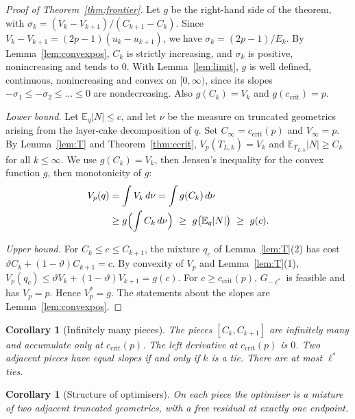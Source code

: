 \documentclass[conference]{IEEEtran}
\newtheorem{corollary}[theorem]{Corollary}
\newcommand{\E}{\mathbb{E}}
\newcommand{\ccrit}{c_{\mathrm{crit}}}
\begin{document}
\begin{proof}[Proof of Theorem~\ref{thm:frontier}]
Let \(g\) be the right-hand side of the theorem, with \(\sigma_k=(V_k-V_{k+1})/(C_{k+1}-C_k)\). Since \(V_k-V_{k+1}=(2p-1)(u_k-u_{k+1})\), we have \(\sigma_k=(2p-1)/E_k\). By Lemma~\ref{lem:convexpos}, \(C_k\) is strictly increasing, and \(\sigma_k\) is positive, nonincreasing and tends to \(0\). With Lemma~\ref{lem:limit}, \(g\) is well defined, continuous, nonincreasing and convex on \([0,\infty)\), since its slopes \(-\sigma_1\le-\sigma_2\le\dots\le0\) are nondecreasing. Also \(g(C_k)=V_k\) and \(g(\ccrit)=p\).

\emph{Lower bound.} Let \(\E_q|N|\le c\), and let \(\nu\) be the measure on truncated geometrics arising from the layer-cake decomposition of \(q\). Set \(C_\infty=\ccrit(p)\) and \(V_\infty=p\). By Lemma~\ref{lem:T} and Theorem~\ref{thm:ccrit}, \(V_p(T_{L,k})=V_k\) and \(\E_{T_{L,k}}|N|\ge C_k\) for all \(k\le\infty\). We use \(g(C_k)=V_k\), then Jensen's inequality for the convex function \(g\), then monotonicity of \(g\):
\begin{align*}
V_p(q)&=\int V_k\,d\nu=\int g(C_k)\,d\nu\\
&\ge g\Bigl(\int C_k\,d\nu\Bigr)\ \ge\ g\bigl(\E_q|N|\bigr)\ \ge\ g(c).
\end{align*}

\emph{Upper bound.} For \(C_k\le c\le C_{k+1}\), the mixture \(q_c\) of Lemma~\ref{lem:T}(2) has cost \(\vartheta C_k+(1-\vartheta)C_{k+1}=c\). By convexity of \(V_p\) and Lemma~\ref{lem:T}(1), \(V_p(q_c)\le\vartheta V_k+(1-\vartheta)V_{k+1}=g(c)\). For \(c\ge\ccrit(p)\), \(G_{-\ell^*}\) is feasible and has \(V_p=p\). Hence \(V_p^*=g\). The statements about the slopes are Lemma~\ref{lem:convexpos}.
\end{proof}

\begin{corollary}[Infinitely many pieces]\label{cor:pieces}
The pieces \([C_k,C_{k+1}]\) are infinitely many and accumulate only at \(\ccrit(p)\). The left derivative at \(\ccrit(p)\) is \(0\). Two adjacent pieces have equal slopes if and only if \(k\) is a tie. There are at most \(\ell^*\) ties.
\end{corollary}

\begin{corollary}[Structure of optimisers]\label{cor:structure}
On each piece the optimiser is a mixture of two adjacent truncated geometrics, with a free residual at exactly one endpoint.
\end{corollary}
\end{document}
